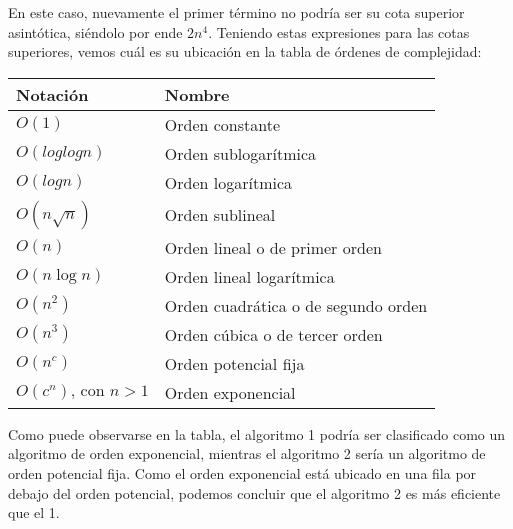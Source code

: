 En este caso, nuevamente el primer término no podría ser su cota superior asintótica, siéndolo por ende $2n^4$.
Teniendo estas expresiones para las cotas superiores, vemos cuál es su ubicación en la tabla de órdenes de complejidad:

\begin{table}[!ht]
    \centering
    \begin{tabular}{ll}
        Notación                     & Nombre                              \\
        \hline
        $O(1)$                       & Orden constante                     \\
        $O(log log n)$               & Orden sublogarítmica                \\
        $O(log n)$                   & Orden logarítmica                   \\
        $O( n \sqrt{n})$             & Orden sublineal                     \\
        $O(n)$                       & Orden lineal o de primer orden      \\
        $O(n \log n)$                & Orden lineal logarítmica            \\
        $O(n^2)$                     & Orden cuadrática o de segundo orden \\
        $O(n^3)$                     & Orden cúbica o de tercer orden      \\
        $O(n^c)$                     & Orden potencial fija                \\
        $O(c^n) \text{, con } n > 1$ & Orden exponencial                   \\
        \hline
    \end{tabular}
\end{table}

Como puede observarse en la tabla, el algoritmo 1 podría ser clasificado como un algoritmo de orden exponencial, mientras el algoritmo 2 sería un algoritmo 
de orden potencial fija. Como el orden exponencial está ubicado en una fila por debajo del orden potencial, podemos concluir que el algoritmo 2 es más eficiente 
que el 1.